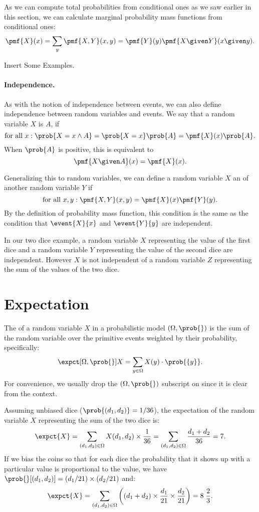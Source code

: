 {As we can compute total probabilities from conditional ones as we saw
earlier in this section, we can calculate marginal probability
mass functions from conditional ones:
\[
\pmf{X}(x) = \sum_{y}{\pmf{X,Y}(x,y)} = \pmf{Y}(y)\pmf{X \given Y}(x \given y).
\]

\begin{todo}
Insert Some Examples.
\end{todo}

\paragraph{Independence.}

As with the notion of independence between events, we can also define
independence between random variables and events.
%
We say that a random variable $X$ is 
$A$, if 
\[
\mbox{for all}~x: \prob{X = x \land A} = \prob{X = x} \prob{A} = \pmf{X}(x) \prob{A}.
\] 
%
When $\prob{A}$ is positive, this is equivalent to 
\[
\pmf{X \given A} (x) = \pmf{X}(x).
\]

Generalizing this to random variables, we can define a random variable
$X$ an  of another random variable $Y$ if 
\[
\mbox{for all}~x, y: \pmf{X,Y}(x,y) = \pmf{X}(x) \pmf{Y}(y).
\]
%
By the definition of probability mass function, this condition is the
same as the condition that $\event{X}{x}$ and $\event{Y}{y}$ are
independent.

In our two dice
example, a random variable $X$ representing the value of the first
dice and a random variable $Y$ representing the value of the second
dice are independent. 
%
However $X$ is not independent of a random variable $Z$ representing
the sum of the values of the two dice.



\section{Expectation}
The  of a random variable $X$ in a probabilistic
model $(\SSpace,\prob{})$ is the sum of the random variable over the
primitive events weighted by their probability, specifically:
\[
\expct[{\SSpace,\prob{}}]{X} = \sum_{y \in \SSpace} X(y) \cdot
\prob{\{y\}}.
\] 
%
For convenience, we  usually drop the $(\SSpace,\prob{})$
subscript on \expct{} since it is clear from the context.


\begin{example}
Assuming unbiased dice ($\prob{(d_1,d_2)} = 1/36$), the expectation of
  the random variable $X$ representing the sum of the two dice is:
\[ 
\expct{X} = \sum_{(d_1,d_2) \in \Omega} X(d_1,d_2)
\times \frac{1}{36} = \sum_{(d_1,d_2) \in \Omega} \frac{d_1+d_2}{36} =
7.
\]
If we bias the coins so that for each dice the probability that it
shows up with a particular value is proportional to the value, we
have $\prob{}[(d_1,d_2)] = (d_1/21) \times (d_2/21)$ and:
\[ 
\expct{X} = \sum_{(d_1,d_2) \in \Omega} \left((d_1+d_2) \times \frac{d_1}{21}\times\frac{d_2}{21}\right) = 8\; \frac{2}{3}.\]
\label{ex:rand:expt}
\end{example}

}
